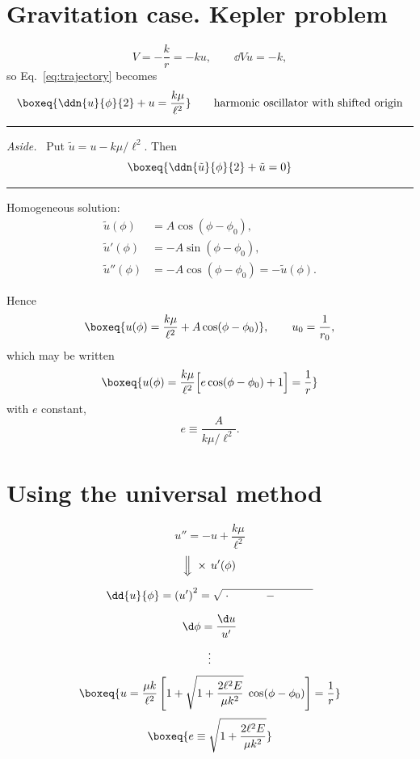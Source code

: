 \documentclass[11pt]{article}
\newenvironment{asidebox}
  {\par\addvspace{6pt}\hrule\addvspace{5pt}\noindent\textit{Aside.}\ }
  {\par\addvspace{5pt}\hrule\addvspace{7pt}}
\begin{document}
\section{Gravitation case. Kepler problem}

\begin{equation}
  V = -\frac{k}{r} = -ku,
  \qquad
  \dd{V}{u} = -k,
\end{equation}
so Eq.~\eqref{eq:trajectory} becomes
\begin{equation}
  \boxeq{\ddn{u}{\phi}{2} + u = \frac{k\mu}{\ell^{2}}}
  \qquad \text{harmonic oscillator with shifted origin}
\end{equation}

\begin{asidebox}
Put $\tilde{u} = u - k\mu/\ell^{2}$. Then
\begin{equation}
  \boxeq{\ddn{\tilde{u}}{\phi}{2} + \tilde{u} = 0}
\end{equation}
\end{asidebox}

\noindent Homogeneous solution:
\begin{align}
  \tilde{u}(\phi) &= A\cos(\phi - \phi_{0}),\\
  \tilde{u}'(\phi) &= -A\sin(\phi - \phi_{0}),\\
  \tilde{u}''(\phi) &= -A\cos(\phi - \phi_{0}) = -\tilde{u}(\phi).
\end{align}

Hence
\begin{equation}
  \boxeq{u(\phi) = \frac{k\mu}{\ell^{2}} + A\cos(\phi - \phi_{0})},
  \qquad u_{0} = \frac{1}{r_{0}},
\end{equation}
which may be written
\begin{equation}
  \boxeq{u(\phi) = \frac{k\mu}{\ell^{2}}\Big[e\cos(\phi - \phi_{0}) + 1\Big]
         = \frac{1}{r}}
\end{equation}
with $e$ constant,
\begin{equation}
  e \equiv \frac{A}{k\mu/\ell^{2}}.
\end{equation}

\section{Using the universal method}

\begin{equation}
  u'' = -u + \frac{k\mu}{\ell^{2}}
\end{equation}
\begin{gather*}
  \Big\Downarrow \;\times\, u'(\phi)\\[6pt]
  \dd{u}{\phi} = \left(u'\right)^{2}
     = \sqrt{\;\cdot\hphantom{1 + 2\ell^{2}}-\hphantom{E/\mu k^{2}}\;}\\[6pt]
  \d\phi = \frac{\d u}{u'}\\[4pt]
  \vdots
\end{gather*}
\begin{equation}
  \boxeq{u = \frac{\mu k}{\ell^{2}}
         \left[1 + \sqrt{1 + \frac{2\ell^{2}E}{\mu k^{2}}}\;\cos(\phi - \phi_{0})\right]
         = \frac{1}{r}}
\end{equation}
\begin{equation}
  \boxeq{e \equiv \sqrt{1 + \frac{2\ell^{2}E}{\mu k^{2}}}}
\end{equation}
\end{document}

